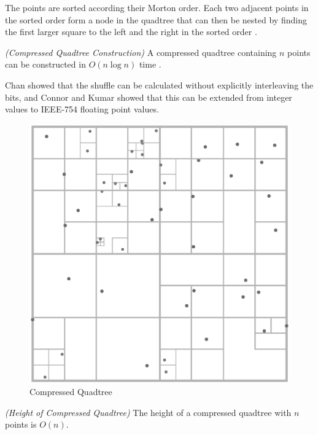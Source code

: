 \documentclass[mcs]{scsthesis}
\begin{document}
The points are sorted according their Morton order. Each two adjacent points in
the sorted order form a node in the quadtree that can then be nested by finding
the first larger square to the left and the right in the sorted order
\cite{bern}.

\begin{thm} \emph{(Compressed Quadtree Construction)}
A compressed quadtree containing $n$ points can be constructed in
\(O(n \log n)\) time \cite{bern}.
\end{thm}

Chan \cite{chan} showed that the shuffle can be calculated without explicitly
interleaving the bits, and Connor and Kumar \cite{connor} showed that this can
be extended from integer values to IEEE-754 floating point values.

\begin{figure}
\begin{center}
\includegraphics[scale=0.35]{diagrams/compressed_quadtree.eps}
\caption{Compressed Quadtree}
\label{fig:compressed_quadtree}
\end{center}
\end{figure}

\begin{thm} \emph{(Height of Compressed Quadtree)}
The height of a compressed quadtree with $n$ points is \(O(n)\).
\end{thm}
\end{document}
